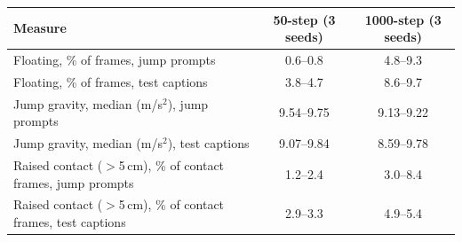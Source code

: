 \begin{tabular}{lcc}
\toprule
Measure & 50-step (3 seeds) & 1000-step (3 seeds) \\
\midrule
Floating, \% of frames, jump prompts & 0.6--0.8 & 4.8--9.3 \\
Floating, \% of frames, test captions & 3.8--4.7 & 8.6--9.7 \\
Jump gravity, median (m/s$^2$), jump prompts & 9.54--9.75 & 9.13--9.22 \\
Jump gravity, median (m/s$^2$), test captions & 9.07--9.84 & 8.59--9.78 \\
Raised contact ($>$5\,cm), \% of contact frames, jump prompts & 1.2--2.4 & 3.0--8.4 \\
Raised contact ($>$5\,cm), \% of contact frames, test captions & 2.9--3.3 & 4.9--5.4 \\
\bottomrule
\end{tabular}

